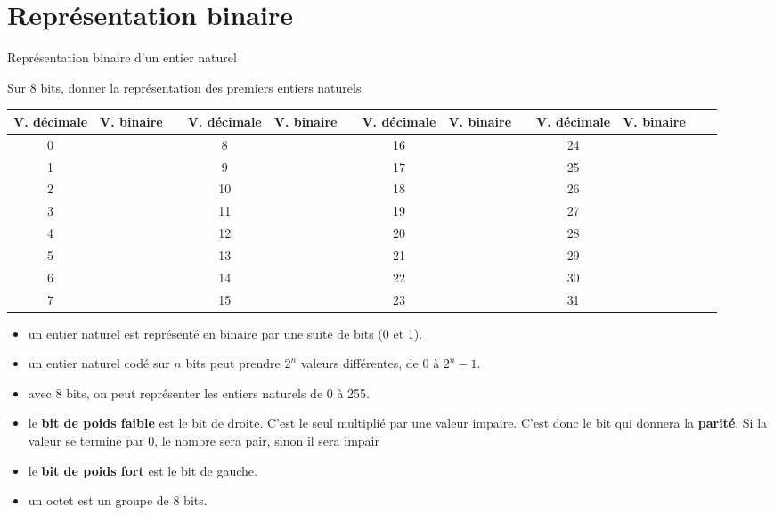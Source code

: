 	\section{Représentation binaire}

	\begin{exercice_cours}{Représentation binaire d'un entier naturel}{}

		Sur 8 bits, donner la représentation des premiers entiers naturels:

\medskip

\begin{tabular}{|c|c|c|c|c|c|c|c|c|c|c|c|c|}
	\hline
	V. décimale & V. binaire & & V. décimale & V. binaire& & V. décimale & V. binaire& & V. décimale & V. binaire\\ \hline
	0 & & & 8 & & & 16 & & & 24 &\\ \hline
	1 & & & 9 & & & 17 & & & 25 &\\ \hline 
	2 & & & 10 & & & 18 & & & 26 &\\ \hline
	3 & & & 11 & & & 19 & & & 27 &\\ \hline
	4 & & & 12 & & & 20 & & & 28 &\\ \hline
	5 & & & 13 & & & 21 & & & 29 &\\ \hline
	6 & & & 14 & & & 22 & & & 30 &\\ \hline
	7 & & & 15 & & & 23 & & & 31 &\\ \hline
	


\end{tabular}

\end{exercice_cours}

\begin{propriete}[A retenir]{}

	\begin{itemize}
		\item un entier naturel est représenté en binaire par une suite de bits (0 et 1).
		\item un entier naturel codé sur $n$ bits peut prendre $2^n$ valeurs différentes, de 0 à $2^n-1$.
		\item avec 8 bits, on peut représenter les entiers naturels de 0 à 255.
		\item le \textbf{bit de poids faible} est le bit de droite. C'est le seul multiplié par une valeur impaire. C'est donc le bit qui donnera la \textbf{parité}. Si la valeur se termine par 0, le nombre sera pair, sinon il sera impair
		\item le \textbf{bit de poids fort} est le bit de gauche.
		\item un octet est un groupe de 8 bits.
	\end{itemize}

\end{propriete}


